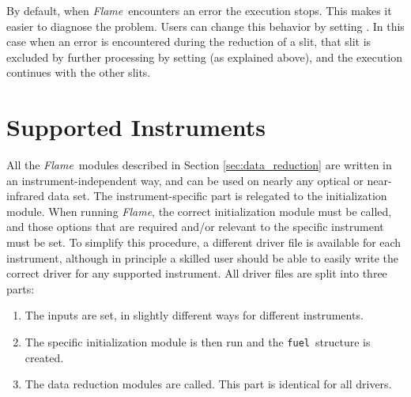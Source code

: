 \documentclass[a4paper]{article}
\newcommand{\flame}{\emph{Flame}}
\newcommand{\fuel}{\texttt{fuel}}
\begin{document}
\begin{sloppypar}
By default, when \flame\ encounters an error the execution stops. This makes it easier to diagnose the problem. Users can change this behavior by setting . In this case when an error is encountered during the reduction of a slit, that slit is excluded by further processing by setting  (as explained above), and the execution continues with the other slits.





\section{Supported Instruments}
\label{sec:instruments}

All the \flame\ modules described in Section \ref{sec:data_reduction} are written in an instrument-independent way, and can be used on nearly any optical or near-infrared data set. The instrument-specific part is relegated to the initialization module. When running \flame, the correct initialization module must be called, and those options that are required and/or relevant to the specific instrument must be set. To simplify this procedure, a different driver file is available for each instrument, although in principle a skilled user should be able to easily write the correct driver for any supported instrument. All driver files are split into three parts:
\begin{enumerate}
  \item The inputs are set, in slightly different ways for different instruments.
  \item The specific initialization module is then run and the \fuel\ structure is created.
  \item The data reduction modules are called. This part is identical for all drivers.
\end{enumerate}


\end{sloppypar}
\end{document}

